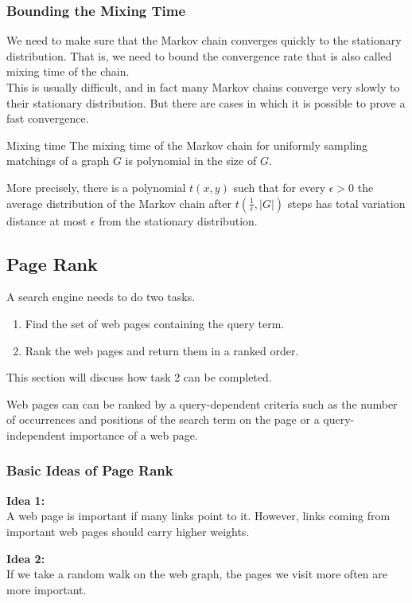 \documentclass[english]{panikzettel}
\begin{document}
\subsubsection{Bounding the Mixing Time}
We need to make sure that the Markov chain converges quickly to the stationary distribution.
That is, we need to bound the convergence rate that is also called mixing time of the chain.\\
This is usually difficult, and in fact many Markov chains converge very slowly to their stationary distribution. But there are cases in which it is possible to prove a fast convergence.


\begin{theo}{Mixing time}
The mixing time of the Markov chain for uniformly sampling matchings of a graph $G$ is polynomial in the size of $G$.

More precisely, there is a polynomial $t(x, y)$ such that for every $\epsilon>0$ the average distribution of the Markov chain after $t(\frac{1}{\epsilon}, |G|)$ steps has
total variation distance at most $\epsilon$ from the stationary distribution.
\end{theo}

\subsection{Page Rank}
\label{afods:pagerank}
A search engine needs to do two tasks.
\begin{enumerate}
\item Find the set of web pages containing the query term.
\item Rank the web pages and return them in a ranked order.
\end{enumerate}
This section will discuss how task 2 can be completed.

Web pages can can be ranked by a query-dependent criteria such as the number of occurrences and positions of the search term on the page or a query-independent importance of a web page.

\subsubsection{Basic Ideas of Page Rank}
\textbf{Idea 1:}\\
A web page is important if many links point to it. However, links coming from important web pages should carry higher weights.

\textbf{Idea 2:}\\
If we take a random walk on the web graph, the pages we visit more often are more important.\\
\end{document}
